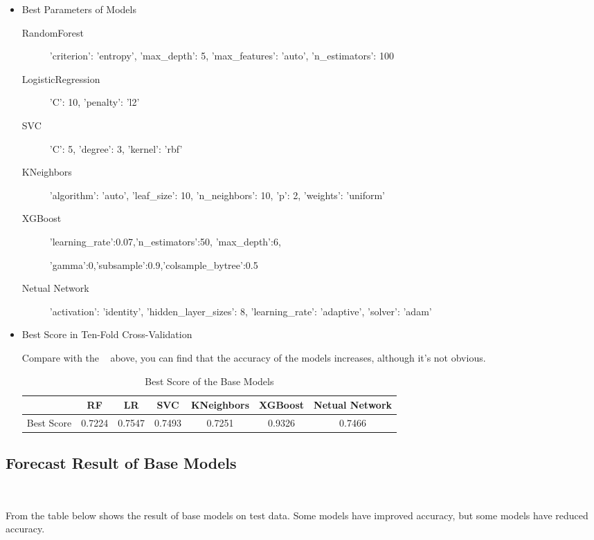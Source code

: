 \begin{itemize}
	\item Best Parameters of Models
	\begin{description}
		\item[RandomForest] 'criterion': 'entropy', 'max_depth': 5, 
		'max_features': 'auto', 'n_estimators': 100 
		\item[LogisticRegression] 'C': 10, 'penalty': 'l2'
		\item[SVC] 'C': 5, 'degree': 3, 'kernel': 'rbf'
		\item[KNeighbors] 'algorithm': 'auto', 'leaf_size': 10, 
		'n_neighbors': 10, 'p': 2, 'weights': 'uniform' 
		\item[XGBoost] 'learning_rate':0.07,'n_estimators':50,
		'max_depth':6,
		
		'gamma':0,'subsample':0.9,'colsample_bytree':0.5
		\item[Netual Network] 'activation': 'identity', 
		'hidden_layer_sizes': 8, 'learning_rate': 'adaptive', 'solver': 'adam'
	\end{description}
	
	\item Best Score in Ten-Fold Cross-Validation
	
	Compare with the  ~
	above,
	you can find that the accuracy of the models increases,
	although it's not obvious.
	
	\begin{table}[h]  \centering
		\caption{Best Score of the Base Models}
		\label{tbl:best_score_base_models_new}
		\begin{tabular}{ccccccc}
			\toprule
			& RF & LR & SVC & KNeighbors & XGBoost & Netual Network\\
			\midrule
			Best Score & 0.7224 & 0.7547 & 0.7493 & 0.7251 & 0.9326 & 0.7466\\
			\bottomrule
		\end{tabular}
	\end{table}
\end{itemize}

\subsection{Forecast Result of Base Models}
\

From the table below
shows the result of base models
on test data.
Some models have improved accuracy, 
but some models have reduced accuracy.

